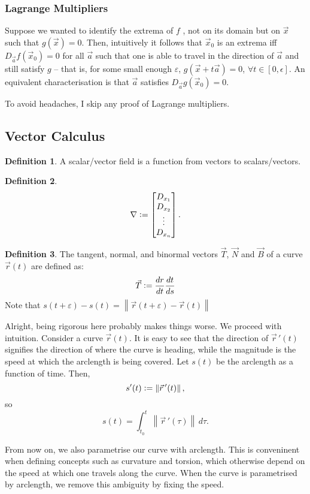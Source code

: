 \documentclass{article}
\newcommand{\vc}{\vcentcolon}
\theoremstyle{definition}
\newtheorem{defn}{Definition}[subsubsection]
\begin{document}
\subsubsection{Lagrange Multipliers}
Suppose we wanted to identify the extrema of $f$ , not on its domain but on $\vec x$ such that $g(\vec x)=0$. Then, intuitively it follows that $\vec x_0$ is an extrema iff $D_{\vec a}f(\vec x_0)=0$ for all $\vec a$ such that one is able to travel in the direction of $\vec a$ and still satisfy $g$ -- that is, for some small enough $\varepsilon$, $g(\vec x+t\vec a)=0$, $\forall t\in[0,\epsilon]$. An equivalent characterisation is that $\vec a$ satisfies $D_{\vec a}g(\vec x_0)=0$.

To avoid headaches, I skip any proof of Lagrange multipliers.

\subsection{Vector Calculus}
\begin{defn}
	A scalar/vector field is a function from vectors to scalars/vectors.
\end{defn}
\begin{defn}
	\[\nabla\vc=\begin{bmatrix}D_{x_1}\\D_{x_2}\\\vdots\\D_{x_n}\end{bmatrix}.\]
\end{defn}
\begin{defn}
	The tangent, normal, and binormal vectors $\vec T$, $\vec N$ and $\vec B$ of a curve $\vec r(t)$ are defined as:
	\begin{align*}
		\vec T\vc=\frac{dr}{dt}\frac{dt}{ds}
	\end{align*}
	Note that $s(t+\varepsilon)-s(t)=\left\lVert\vec r(t+\varepsilon)-\vec r(t)\right\rVert$
\end{defn}
Alright, being rigorous here probably makes things worse. We proceed with intuition.
Consider a curve $\vec r(t)$. It is easy to see that the direction of $\vec r\,'(t)$ signifies the direction of where the curve is heading, while the magnitude is the speed at which the arclength is being covered. Let $s(t)$ be the arclength as a function of time. Then, 
\[s'(t)\vc=\left\lVert\vec r\,'(t)\right\rVert,\] 
so 
\[s(t)=\int_{t_0}^t\left\lVert\vec r\,'(\tau)\right\rVert\,d\tau.\]\par
From now on, we also parametrise our curve with arclength. This is conveninent when defining concepts such as curvature and torsion, which otherwise depend on the speed at which one travels along the curve. When the curve is parametrised by arclength, we remove this ambiguity by fixing the speed.\par
\end{document}
